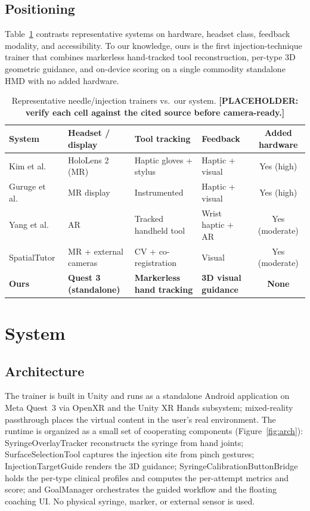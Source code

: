\documentclass[sigconf]{acmart}
\begin{document}
\subsection{Positioning}
Table~\ref{tab:related} contrasts representative systems on hardware, headset class, feedback
modality, and accessibility. To our knowledge, ours is the first injection-technique trainer that
combines markerless hand-tracked tool reconstruction, per-type 3D geometric guidance, and on-device
scoring on a single commodity standalone HMD with no added hardware.

\begin{table}[t]
  \centering
  \caption{Representative needle/injection trainers vs.\ our system. \textbf{[PLACEHOLDER: verify
  each cell against the cited source before camera-ready.]}}
  \label{tab:related}
  \begin{tabular}{llllc}
    \toprule
    System & Headset / display & Tool tracking & Feedback & Added hardware \\
    \midrule
    Kim et al.~\cite{kim2023bimanual} & HoloLens 2 (MR) & Haptic gloves + stylus & Haptic + visual & Yes (high) \\
    Guruge et al.~\cite{guruge2025acupuncture} & MR display & Instrumented & Haptic + visual & Yes (high) \\
    Yang et al.~\cite{yang2026multimodal} & AR & Tracked handheld tool & Wrist haptic + AR & Yes (moderate) \\
    SpatialTutor~\cite{spatialtutor2024} & MR + external cameras & CV + co-registration & Visual & Yes (moderate) \\
    \textbf{Ours} & \textbf{Quest 3 (standalone)} & \textbf{Markerless hand tracking} & \textbf{3D visual guidance} & \textbf{None} \\
    \bottomrule
  \end{tabular}
\end{table}

\section{System}
\subsection{Architecture}
The trainer is built in Unity and runs as a standalone Android application on Meta Quest~3 via
OpenXR and the Unity XR Hands subsystem; mixed-reality passthrough places the virtual content in
the user's real environment. The runtime is organized as a small set of cooperating components
(Figure~\ref{fig:arch}): \textsf{SyringeOverlayTracker} reconstructs the syringe from hand joints;
\textsf{SurfaceSelectionTool} captures the injection site from pinch gestures;
\textsf{InjectionTargetGuide} renders the 3D guidance; \textsf{SyringeCalibrationButtonBridge}
holds the per-type clinical profiles and computes the per-attempt metrics and score; and
\textsf{GoalManager} orchestrates the guided workflow and the floating coaching UI. No physical
syringe, marker, or external sensor is used.
\end{document}
